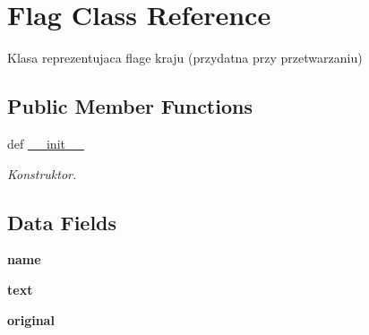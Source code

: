 \hypertarget{classwszystko_1_1_flag}{\section{Flag Class Reference}
\label{classwszystko_1_1_flag}
}


Klasa reprezentujaca flage kraju (przydatna przy przetwarzaniu)  


\subsection*{Public Member Functions}
\begin{DoxyCompactItemize}
\item 
\hypertarget{classwszystko_1_1_flag_ac775ee34451fdfa742b318538164070e}{def \hyperlink{classwszystko_1_1_flag_ac775ee34451fdfa742b318538164070e}{\-\_\-\-\_\-init\-\_\-\-\_\-}}\label{classwszystko_1_1_flag_ac775ee34451fdfa742b318538164070e}

\begin{DoxyCompactList}\small\item\em Konstruktor. \end{DoxyCompactList}\end{DoxyCompactItemize}
\subsection*{Data Fields}
\begin{DoxyCompactItemize}
\item 
\hypertarget{classwszystko_1_1_flag_ab74e6bf80237ddc4109968cedc58c151}{{\bfseries name}}\label{classwszystko_1_1_flag_ab74e6bf80237ddc4109968cedc58c151}

\item 
\hypertarget{classwszystko_1_1_flag_af575f17e6be3f269b86b041a60560dbf}{{\bfseries text}}\label{classwszystko_1_1_flag_af575f17e6be3f269b86b041a60560dbf}

\item 
\hypertarget{classwszystko_1_1_flag_a5ecdd78281943d5d33931665c18f0981}{{\bfseries original}}\label{classwszystko_1_1_flag_a5ecdd78281943d5d33931665c18f0981}

\end{DoxyCompactItemize}
